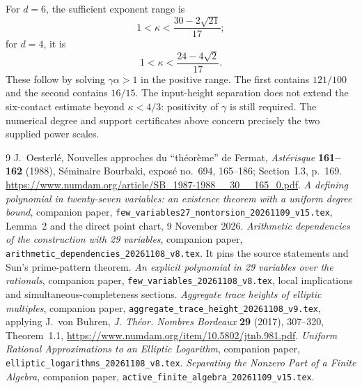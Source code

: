 \documentclass[11pt,a4paper]{article}
\begin{document}
For $d=6$, the sufficient exponent range is
\[
 1<\kappa<\frac{30-2\sqrt{21}}{17};
\]
for $d=4$, it is
\[
 1<\kappa<\frac{24-4\sqrt2}{17}.
\]
These follow by solving $\gamma\alpha>1$ in the positive range.
The first contains $121/100$ and the second contains $16/15$.
The input-height separation does not extend the six-contact
estimate beyond $\kappa<4/3$: positivity of $\gamma$ is still
required. The numerical degree and support certificates above
concern precisely the two supplied power scales.

\clearpage
\begin{thebibliography}{9}
J.~Oesterl\'e, Nouvelles approches du ``th\'eor\`eme'' de Fermat,
\emph{Ast\'erisque} \textbf{161--162} (1988), S\'eminaire
Bourbaki, expos\'e no.~694, 165--186; Section~I.3, p.~169.
\url{https://www.numdam.org/article/SB_1987-1988__30__165_0.pdf}.
\emph{A defining polynomial in twenty-seven variables:
an existence theorem with a uniform degree bound},
companion paper,
\nolinkurl{few_variables27_nontorsion_20261109_v15.tex},
Lemma~2 and the direct point chart, 9 November 2026.
\emph{Arithmetic dependencies of the construction with 29 variables},
companion paper,
\nolinkurl{arithmetic_dependencies_20261108_v8.tex}.
It pins the source statements and Sun's prime-pattern theorem.
\emph{An explicit polynomial in 29 variables over the rationals},
companion paper, \nolinkurl{few_variables_20261108_v8.tex},
local implications and simultaneous-completeness sections.
\emph{Aggregate trace heights of elliptic multiples}, companion
paper, \nolinkurl{aggregate_trace_height_20261108_v9.tex},
applying J.~von Buhren,
\emph{J. Th\'eor. Nombres Bordeaux} \textbf{29} (2017), 307--320,
Theorem~1.1, \url{https://www.numdam.org/item/10.5802/jtnb.981.pdf}.
\emph{Uniform Rational Approximations to an Elliptic Logarithm},
companion paper, \nolinkurl{elliptic_logarithms_20261108_v8.tex}.
\emph{Separating the Nonzero Part of a Finite Algebra},
companion paper, \nolinkurl{active_finite_algebra_20261109_v15.tex}.
\end{thebibliography}
\end{document}
